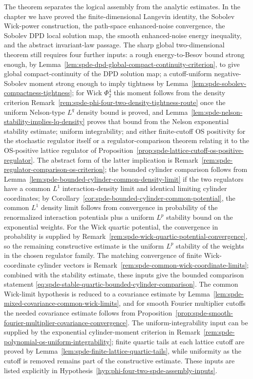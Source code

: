 The theorem separates the logical assembly from the analytic estimates.  In
the chapter we have proved the finite-dimensional Langevin identity, the
Sobolev Wick-power construction, the path-space enhanced-noise convergence,
the Sobolev DPD local solution map, the smooth enhanced-noise energy
inequality, and the abstract invariant-law passage.  The sharp global
two-dimensional theorem still requires four further inputs: a rough
energy-to-Besov bound strong enough, by
Lemma~\ref{lem:spde-dpd-global-compact-continuity-criterion}, to
give global compact-continuity of the DPD solution map; a cutoff-uniform
negative-Sobolev moment strong enough to imply tightness by
Lemma~\ref{lem:spde-sobolev-compactness-tightness}; for Wick
\(\Phi^4_2\) this moment follows from the density criterion
Remark~\ref{rem:spde-phi-four-two-density-tightness-route} once the
uniform Nelson-type \(L^q\) density bound is proved, and
	Lemma~\ref{lem:spde-nelson-stability-implies-lq-density} proves that
bound from the Nelson exponential stability estimate; uniform integrability;
and either finite-cutoff OS positivity for the stochastic regulator itself or
a regulator-comparison theorem relating it to the
OS-positive lattice regulator of
Proposition~\ref{prop:spde-lattice-cutoff-os-positive-regulator}.  The
abstract form of the latter implication is
Remark~\ref{rem:spde-regulator-comparison-os-criterion}; the bounded
cylinder comparison follows from
Lemma~\ref{lem:spde-bounded-cylinder-common-density-limit} if the two
regulators have a common \(L^1\) interaction-density limit and identical
limiting cylinder coordinates; by
Corollary~\ref{cor:spde-bounded-cylinder-common-potential}, the common
\(L^1\) density limit follows from convergence in probability of the
renormalized interaction potentials plus a uniform \(L^p\) stability bound
on the exponential weights.  For the Wick quartic potential, the convergence
in probability is supplied by
Remark~\ref{rem:spde-wick-quartic-potential-convergence}, so the
remaining constructive estimate is the uniform \(L^p\) stability of the
weights in the chosen regulator family.  The matching convergence of finite
Wick-coordinate cylinder vectors is
Remark~\ref{rem:spde-common-wick-coordinate-limits}; combined with the
stability estimate, these inputs give the bounded comparison statement
\eqref{eq:spde-stable-quartic-bounded-cylinder-comparison}.
The common Wick-limit hypothesis is reduced to a covariance estimate by
Lemma~\ref{lem:spde-mixed-covariance-common-wick-limits}, and for
smooth Fourier multiplier cutoffs the needed covariance estimate follows
from
Proposition~\ref{prop:spde-smooth-fourier-multiplier-covariance-convergence}.
The uniform-integrability input can be supplied by the exponential
cylinder-moment criterion in
Remark~\ref{rem:spde-polynomial-os-uniform-integrability}; finite
quartic tails at each lattice cutoff are proved by
Lemma~\ref{lem:spde-finite-lattice-quartic-tails}, while uniformity
as the cutoff is removed remains part of the constructive estimate.  These
inputs are listed explicitly in
Hypothesis~\ref{hyp:phi-four-two-spde-assembly-inputs}.

